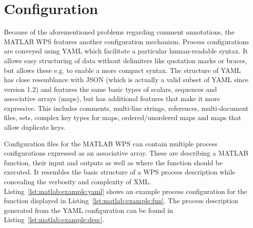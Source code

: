 	\section{Configuration}
		\label{sec:matlab:conf}
		Because of the aforementioned problems regarding comment annotations, the MATLAB WPS features another configuration mechanism. Process configurations are conveyed using YAML \citep{yaml} which facilitate a particular human-readable syntax. It allows easy structuring of data without delimiters like quotation marks or braces, but allows these e.g. to enable a more compact syntax. The structure of YAML has close resemblance with JSON (which is actually a valid subset of YAML since version 1.2) and features the same basic types of scalars, sequences and associative arrays (maps), but has additional features that make it more expressive. This includes comments, multi-line strings, references, multi-document files, sets, complex key types for maps, ordered/unordered maps and maps that allow duplicate keys.
		
		Configuration files for the MATLAB WPS can contain multiple process configurations expressed as an associative array. These are describing a MATLAB function, their input and outputs as well as where the function should be executed. It resembles the basic structure of a WPS process description while concealing the verbosity and complexity of XML. Listing~\ref{lst:matlab:example:yaml} shows an example process configuration for the function displayed in Listing~\ref{lst:matlab:example:fun}. The process description generated from the YAML configuration can be found in Listing~\ref{lst:matlab:example:desc}.

